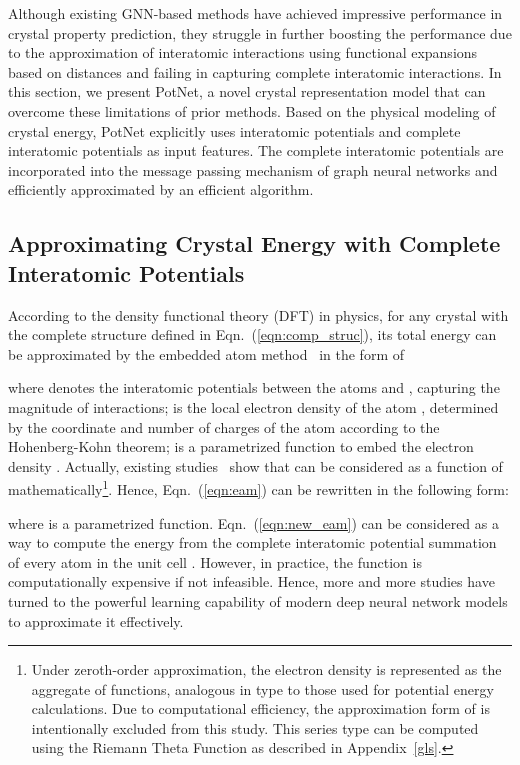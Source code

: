 \documentclass[nohyperref]{article}
\theoremstyle{plain}
\theoremstyle{definition}
\theoremstyle{remark}
\begin{document}
Although existing GNN-based methods have achieved impressive performance in crystal property prediction, they struggle in further boosting the performance due to the approximation of interatomic interactions using functional expansions based on distances and failing in capturing complete interatomic interactions. In this section, we present PotNet, a novel crystal representation model that can overcome these limitations of prior methods. Based on the physical modeling of crystal energy, PotNet explicitly uses interatomic potentials and complete interatomic potentials as input features. The complete interatomic potentials are incorporated into the message passing mechanism of graph neural networks and efficiently approximated by an efficient algorithm.


\subsection{Approximating Crystal Energy with Complete Interatomic Potentials}
\label{importance}


According to the density functional theory (DFT) in physics, for any crystal  with the complete structure  defined in Eqn.~(\ref{eqn:comp_struc}), its total energy 
 can be approximated by the embedded atom method~\citep{daw1984embedded,eam,eamcovalent,eamionic,riffe2018vibrational} in the form of

where  denotes the interatomic potentials between the atoms  and , capturing the magnitude of interactions;  is the local electron density of the atom ,  determined by the coordinate and number of charges of the atom  according to the Hohenberg-Kohn theorem;  is a parametrized function to embed the electron density . Actually, existing studies~\citep{density} show that  can be considered as a function of  mathematically\footnote{Under zeroth-order approximation, the electron density  is represented as the aggregate of functions, analogous in type to those used for potential energy calculations. Due to computational efficiency, the approximation form of  is intentionally excluded from this study. This series type can be computed using the Riemann Theta Function as described in Appendix~\ref{gls}.}. Hence, Eqn.~(\ref{eqn:eam}) can be rewritten in the following form:

where  is a parametrized function. Eqn.~(\ref{eqn:new_eam}) can be considered as a way to compute the energy from the complete interatomic potential summation  of every atom  in the unit cell . However, in practice, the function  is computationally expensive if not infeasible. Hence, more and more studies have turned to the powerful learning capability of modern deep neural network models to approximate it effectively. 
\end{document}
